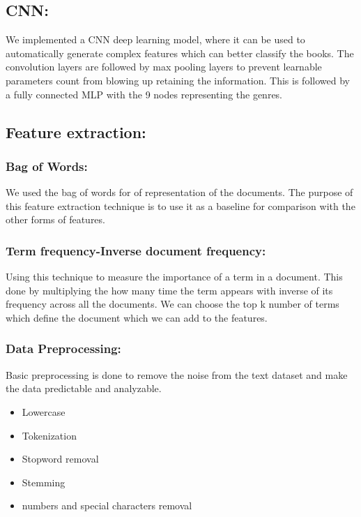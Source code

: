 \documentclass[conference]{IEEEtran}
\begin{document}
\subsection{CNN:}
\justify We implemented a CNN \cite{Huang2017} deep learning model, where it can be used to automatically generate complex features which can better classify the books. The convolution layers are followed by max pooling layers to prevent learnable parameters count from blowing up retaining the information. This is followed by a fully connected MLP with the 9 nodes representing the genres.
\subsection{Feature extraction:}
\subsubsection{Bag of Words:}
\justify We used the bag of words for of representation of the documents. The purpose of this feature extraction technique is to use it as a baseline\cite{Pieters2018} for comparison with the other forms of features.
\vspace{1mm}
\subsubsection{Term frequency-Inverse document frequency:}
\justify Using this technique to measure the importance of a term in a document. This done by multiplying the how many time the term appears with inverse of its frequency across all the documents. We can choose the top k number of terms which define the document which we can add to the features.
\vspace{1mm}
\subsubsection{Data Preprocessing:}
\justify Basic preprocessing is done to remove the noise from the text dataset and make the data predictable and analyzable. 
\begin{itemize}
    \item Lowercase
    \item Tokenization
    \item Stopword removal
    \item Stemming
    \item numbers and special characters removal
\end{itemize}
\vspace{1mm}
\end{document}
